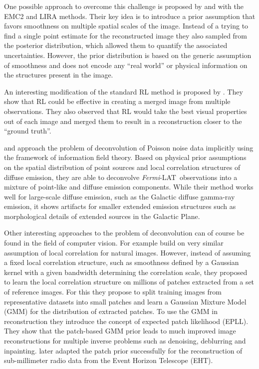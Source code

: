 \documentclass[twocolumn, linenumbers]{aastex631}
\newcommand{\fermi}{\textit{Fermi}-LAT~}
\begin{document}
    One possible approach to overcome this challenge is proposed by \cite{Esch2004} and \cite{Connors2011} with the EMC2 and LIRA methods. Their key idea is to introduce a prior assumption that favors smoothness on multiple spatial scales of the image. Instead of a trying to find a single point estimate for the reconstructed image they also sampled from the posterior distribution, which allowed them to quantify the associated uncertainties. However, the prior distribution is based on the generic assumption of smoothness and does not encode any \enquote{real world} or physical information on the structures present in the image.

    An interesting modification of the standard RL method is proposed by \cite{Ingaramo2014}. They show that RL could be effective in creating a merged image from multiple observations. They also observed that RL would take the best visual properties out of each image and merged them to result in a reconstruction closer to the \enquote{ground truth}.
    
    \cite{Selig2015} and \cite{Pumpe2018} approach the problem of deconvolution of Poisson noise data implicitly using the framework of information field theory. Based on physical prior assumptions on the spatial distribution of point sources and local correlation structures of diffuse emission, they are able to deconvolve \fermi observations
    into a mixture of point-like and diffuse emission components. While their method works well for large-scale diffuse emission, such as the Galactic diffuse gamma-ray emission, it shows artifacts for smaller extended emission structures such as morphological details of extended sources in the Galactic Plane.
    
    Other interesting approaches to the problem of deconvolution can of course be found in the field of computer vision. For example \cite{Zoran2011} build on very similar assumption of local correlation for natural images. However, instead of assuming a fixed local correlation structure, such as smoothness defined by a Gaussian kernel with a given bandwidth determining the correlation scale, they proposed to learn the local correlation structure on millions of patches extracted from a set of reference images. For this they propose to split training images from representative datasets into small patches and learn a  Gaussian Mixture Model (GMM) for the distribution of extracted patches. To use the GMM in reconstruction they introduce the concept of expected patch likelihood (EPLL). They show that the patch-based GMM prior leads to much improved image reconstructions for multiple inverse problems such as denoising, deblurring and inpainting. \cite{Bouman2016} later adapted the patch prior successfully for the reconstruction of sub-millimeter radio data from the Event Horizon Telescope (EHT).
    
\end{document}
